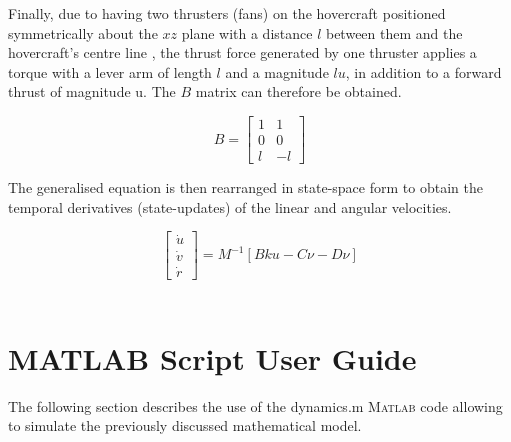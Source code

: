 \documentclass[a4paper,12pt]{article}
\begin{document}
Finally, due to having two thrusters (fans) on the hovercraft positioned symmetrically about the \(xz\) plane with a distance \(l\) between them and the hovercraft's centre line , the thrust force generated by one thruster applies a torque with a lever arm of length \(l\) and a magnitude \(lu\), in addition to a forward thrust of magnitude u. The \(B\) matrix can therefore be obtained.

\begin{equation}
    B =
    \begin{bmatrix}
        1 & 1\\
        0 & 0\\
        l & -l
    \end{bmatrix}
\end{equation}

The generalised equation is then rearranged in state-space form to obtain the temporal derivatives (state-updates) of the linear and angular velocities.

\begin{equation}
    \begin{bmatrix}
        \dot{u}\\
        \dot{v}\\
        \dot{r}
    \end{bmatrix}
    = M^{-1} [Bku - C\nu - D\nu]
\end{equation}\\

\section{MATLAB Script User Guide}

The following section describes the use of the dynamics.m
 \textsc{Matlab} code allowing to simulate the previously discussed mathematical model.
\end{document}
